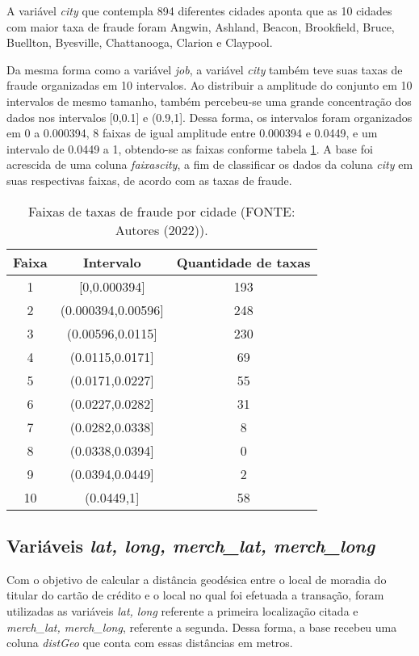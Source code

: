 \documentclass{article}
\begin{document}
A variável \textit{city} que contempla 894 diferentes cidades aponta que as 10 cidades com maior taxa de fraude foram Angwin, Ashland, Beacon, Brookfield, Bruce, Buellton, Byesville, Chattanooga, Clarion e Claypool. 

Da mesma forma como a variável \textit{job}, a variável \textit{city} também teve suas taxas de fraude organizadas em 10 intervalos. Ao distribuir a amplitude do conjunto em 10 intervalos de mesmo tamanho, também percebeu-se uma grande concentração dos dados nos intervalos [0,0.1] e (0.9,1]. Dessa forma, os intervalos foram organizados em 0 a 0.000394, 8 faixas de igual amplitude entre 0.000394 e 0.0449, e um intervalo de 0.0449 a 1, obtendo-se as faixas conforme tabela \ref{tab-city}. A base foi acrescida de uma coluna \textit{faixascity}, a fim de classificar os dados da coluna \textit{city} em suas respectivas faixas, de acordo com as taxas de fraude.

\begin{table}[!ht]
\centering
\begin{tabular}{ccc}
Faixa & Intervalo             & Quantidade de taxas \\ \hline
1     & {[}0,0.000394{]}      & 193                  \\
2     & ({0.000394,0.00596]}  & 248                 \\
3     & ({0.00596,0.0115]}    & 230                  \\
4     & ({0.0115,0.0171]}     & 69                 \\
5     & ({0.0171,0.0227]}     & 55                 \\
6     & ({0.0227,0.0282]}     & 31                 \\
7     & ({0.0282,0.0338]}     & 8                \\
8     & ({0.0338,0.0394]}     & 0               \\
9     & ({0.0394,0.0449]}     & 2                \\
10    & ({0.0449,1]}          & 58                
\end{tabular}
\caption{Faixas de taxas de fraude por cidade (FONTE: Autores (2022)).}
\label{tab-city}
\end{table}


\subsection{Variáveis \textit{lat, long, merch\_lat, merch\_long}}

Com o objetivo de calcular a distância geodésica entre o local de moradia do titular do cartão de crédito e o local no qual foi efetuada a transação, foram utilizadas as variáveis \textit{lat, long} referente a primeira localização citada e \textit{merch\_lat, merch\_long}, referente a segunda. Dessa forma, a base recebeu uma coluna \textit{distGeo} que conta com essas distâncias em metros.

\end{document}

